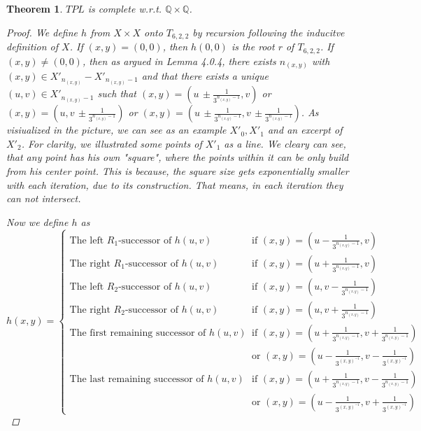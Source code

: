 \documentclass[12pt, a4paper]{scrartcl}
\newtheorem{theorem}[definition]{Theorem}
\begin{document}
\begin{theorem}
    $TPL$ is complete w.r.t. $\mathbb{Q} \times \mathbb{Q}$.

    \begin{proof}
        We define $h$ from $X \times X$ onto $T_{6,2,2}$ by recursion following the inducitve definition of $X$.
        If $(x,y) = (0,0)$, then $h(0,0)$ is the root $r$ of $T_{6,2,2}$. If $(x,y) \neq (0,0)$, then as argued in Lemma 4.0.4, there exists
        $n_{(x,y)}$ with $(x,y) \in X'_{n_{(x,y)}} - X'_{n_{(x,y)}-1}$ and that there exists a unique $(u,v) \in X'_{n_{(x,y)}-1}$ such that 
        $(x,y) =  (u \, \pm \frac{1}{3^{n_{(x,y)}-1}}, v)$ or $(x,y) =  (u, v \, \pm \frac{1}{3^{n_{(x,y)}-1}})$
        or $(x,y) =  (u \, \pm \frac{1}{3^{n_{(x,y)}-1}}, v \, \pm \frac{1}{3^{n_{(x,y)}-1}})$. \newline 
        As visiualized in the picture, we can see  as an example $X'_0,X'_1$ and an excerpt of $X'_2$. For clarity, we illustrated some points of $X'_1$ as a line. We cleary can see, 
        that any point has his own "square", where the points within it can be only build from his center point. This is because, the square size gets exponentially smaller with each iteration, due to its construction.
        That means, in each iteration they can not intersect.

        Now we define $h$ as 
        \[
            h(x,y) = 
            \begin{cases}
                \mbox{The left } R_1 \mbox{-successor of } h(u,v)  &\mbox{if } (x,y) = (u- \frac{1}{3^{n_{(x,y)}-1}},v) \\
                \mbox{The right } R_1 \mbox{-successor of } h(u,v)  &\mbox{if } (x,y) = (u+ \frac{1}{3^{n_{(x,y)}-1}},v) \\
                \mbox{The left } R_2 \mbox{-successor of } h(u,v)  &\mbox{if } (x,y) = (u, v - \frac{1}{3^{n_{(x,y)}-1}}) \\
                \mbox{The right } R_2 \mbox{-successor of } h(u,v)  &\mbox{if } (x,y) = (u, v + \frac{1}{3^{n_{(x,y)}-1}}) \\
                \mbox{The first remaining successor of } h(u,v)  &\mbox{if } (x,y) = (u+ \frac{1}{3^{n_{(x,y)}-1}}, v+ \frac{1}{3^{n_{(x,y)}-1}}) \\
                \quad &\text{or } (x, y) = (u - \frac{1}{3^{(x,y)^{-1}}}, v - \frac{1}{3^{(x,y)^{-1}}}) \\
                \mbox{The last remaining successor of } h(u,v)  &\mbox{if } (x,y) = (u+ \frac{1}{3^{n_{(x,y)}-1}}, v- \frac{1}{3^{n_{(x,y)}-1}}) \\
                \quad &\text{or } (x, y) = (u - \frac{1}{3^{(x,y)^{-1}}}, v + \frac{1}{3^{(x,y)^{-1}}}) 
                


\end{cases}\]
\end{proof}
\end{theorem}
\end{document}

